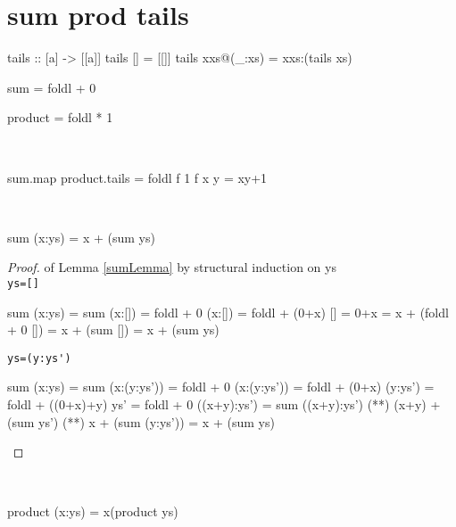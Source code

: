 \section{sum prod tails}
\begin{code}
tails :: [a] -> [[a]]
tails []         = [[]]
tails xxs@(_:xs) = xxs:(tails xs)
\end{code}
\begin{code}
sum = foldl + 0
\end{code}
\begin{code}
product = foldl * 1
\end{code}
\begin{claim}\label{tailsClaim}\ 
\begin{code}
sum.map product.tails = foldl f 1
                f x y = xy+1
\end{code}
\end{claim}\begin{lemma}\label{sumLemma}\ 
\begin{code}
sum (x:ys) = x + (sum ys)
\end{code}
\end{lemma}
\begin{proof} of Lemma \ref{sumLemma} by structural induction on ys\\
\verb|ys=[]|
\begin{code}
sum (x:ys) = sum (x:[])
           = foldl + 0 (x:[])
           = foldl + (0+x) []
           = 0+x
           = x + (foldl + 0 [])
           = x + (sum [])
           = x + (sum ys)
\end{code}
\verb|ys=(y:ys')|
\begin{code}
sum (x:ys) = sum (x:(y:ys'))
           = foldl + 0 (x:(y:ys'))
           = foldl + (0+x) (y:ys')
           = foldl + ((0+x)+y) ys'
           = foldl + 0 ((x+y):ys')
           = sum ((x+y):ys')
           (**) (x+y) + (sum ys')
           (*\sEq{IH}*) x + (sum (y:ys'))
           = x + (sum ys)
\end{code}
\end{proof}
\begin{lemma}\label{prodLemma}\ 
\begin{code}
product (x:ys) = x(product ys)
\end{code}
\end{lemma}
